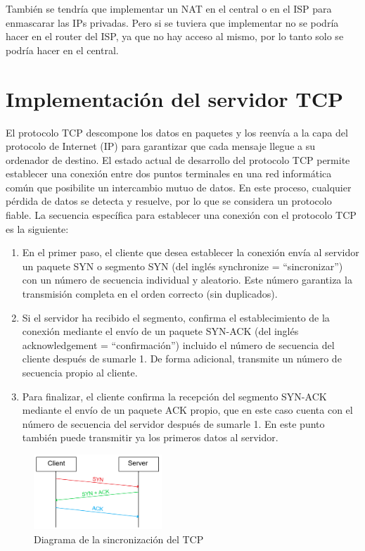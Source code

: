 \documentclass[letterpaper, 10 pt, conference]{ieeeconf}  %
\begin{document}
También se tendría que implementar un NAT en el central o en el ISP para enmascarar las IPs privadas. Pero si se tuviera que implementar no se podría hacer en el router del ISP, ya que no hay acceso al mismo, por lo tanto solo se podría hacer en el central.


\section{Implementación del servidor TCP}

El protocolo TCP descompone los datos en paquetes y los reenvía a la capa del protocolo de Internet (IP) para garantizar que cada mensaje llegue a su ordenador de destino. El estado actual de desarrollo del protocolo TCP permite establecer una conexión entre dos puntos terminales en una red informática común que posibilite un intercambio mutuo de datos. En este proceso, cualquier pérdida de datos se detecta y resuelve, por lo que se considera un protocolo fiable. La secuencia específica para establecer una conexión con el protocolo TCP es la siguiente:

\begin{enumerate}
	\item En el primer paso, el cliente que desea establecer la conexión envía al servidor un paquete SYN o segmento SYN (del inglés synchronize = “sincronizar”) con un número de secuencia individual y aleatorio. Este número garantiza la transmisión completa en el orden correcto (sin duplicados).
	\item Si el servidor ha recibido el segmento, confirma el establecimiento de la conexión mediante el envío de un paquete SYN-ACK (del inglés acknowledgement = “confirmación”) incluido el número de secuencia del cliente después de sumarle 1. De forma adicional, transmite un número de secuencia propio al cliente.
	\item Para finalizar, el cliente confirma la recepción del segmento SYN-ACK mediante el envío de un paquete ACK propio, que en este caso cuenta con el número de secuencia del servidor después de sumarle 1. En este punto también puede transmitir ya los primeros datos al servidor.
\end{enumerate}

\begin{figure}[H]
	\centering
	\includegraphics[width=0.43\textwidth]{./Imagenes/tcp_ack.png}
	\caption{Diagrama de la sincronización del TCP}
	\label{fig:tcp_ack}
\end{figure}
\end{document}
